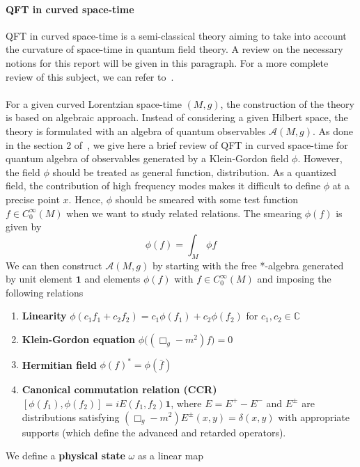 \paragraph{QFT in curved space-time}
QFT in curved space-time is a semi-classical theory aiming to take into account the curvature of space-time in quantum field theory.
A review on the necessary notions for this report will be given in this paragraph.
For a more complete review of this subject, we can refer to~\cite{Hollands2014}. \\\\
%
For a given curved Lorentzian space-time $(M,g)$,
the construction of the theory is based on algebraic approach.
Instead of considering a given Hilbert space, 
the theory is formulated with an algebra of quantum observables $\mathscr{A}(M,g)$.
As done in the section 2 of~\cite{Hollands2014}, we give here a brief review of QFT in curved space-time for quantum algebra of observables generated by a Klein-Gordon field $\phi$. 
However, the field $\phi$ should be treated as general function, \ie  distribution.
As a quantized field, the contribution of high frequency modes makes it difficult to define $\phi$ at a precise point $x$.
Hence, $\phi$ should be smeared with some test function $f\in C^\infty_0(M)$ when we want to study related relations.
The smearing $\phi(f)$ is given by
\begin{equation*}
\phi(f) = \int_M \phi f
\end{equation*}
We can then construct $\mathscr{A}(M,g)$ by starting with the free *-algebra generated by unit element $\mathbf{1}$ and elements $\phi(f)$ with $f\in C^\infty_0(M)$ and imposing the following relations \\
\begin{enumerate}
\item \textbf{Linearity} $\phi(c_1 f_1 + c_2 f_2) = c_1 \phi(f_1) + c_2 \phi(f_2)$ for $c_1, c_2 \in \mathbb{C}$
%
\item \textbf{Klein-Gordon equation} $\phi\big( (\Box_g - m^2)f \big) = 0$
%
\item \textbf{Hermitian field} $\phi(f)^* = \phi(\bar{f})$
%
\item \textbf{Canonical commutation relation (CCR)} $[\phi(f_1), \phi(f_2)] = iE(f_1, f_2) \mathbf{1}$, where $E = E^+ - E^-$ and $E^\pm$ are distributions satisfying $(\Box_g - m^2)E^\pm(x,y) = \delta(x,y)$ with appropriate supports (which define the advanced and retarded operators).
\end{enumerate}
%
We define a \textbf{physical state} $\omega$ as a linear map
